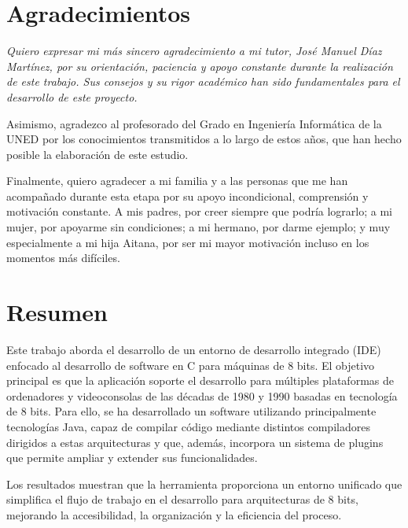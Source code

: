 \documentclass[12pt,twoside]{book}
\begin{document}
 
\chapter*{Agradecimientos}
\thispagestyle{empty}
\begin{flushright}
{\itshape
	Quiero expresar mi más sincero agradecimiento a mi tutor, José Manuel Díaz Martínez, por su orientación, paciencia y apoyo constante durante la realización de este trabajo. Sus consejos y su rigor académico han sido fundamentales para el desarrollo de este proyecto.
\par
	Asimismo, agradezco al profesorado del Grado en Ingeniería Informática de la UNED por los conocimientos transmitidos a lo largo de estos años, que han hecho posible la elaboración de este estudio.
\par
	Finalmente, quiero agradecer a mi familia y a las personas que me han acompañado durante esta etapa por su apoyo incondicional, comprensión y motivación constante. A mis padres, por creer siempre que podría lograrlo; a mi mujer, por apoyarme sin condiciones; a mi hermano, por darme ejemplo; y muy especialmente a mi hija Aitana, por ser mi mayor motivación incluso en los momentos más difíciles.
}
\end{flushright}

\chapter*{Resumen} %

Este trabajo aborda el desarrollo de un entorno de desarrollo integrado (IDE) enfocado al desarrollo de software en C para máquinas de 8 bits. El objetivo principal es que la aplicación soporte el desarrollo para múltiples plataformas de ordenadores y videoconsolas de las décadas de 1980 y 1990 basadas en tecnología de 8 bits. Para ello, se ha desarrollado un software utilizando principalmente tecnologías Java, capaz de compilar código mediante distintos compiladores dirigidos a estas arquitecturas y que, además, incorpora un sistema de plugins que permite ampliar y extender sus funcionalidades.

Los resultados muestran que la herramienta proporciona un entorno unificado que simplifica el flujo de trabajo en el desarrollo para arquitecturas de 8 bits, mejorando la accesibilidad, la organización y la eficiencia del proceso.
\end{document}

